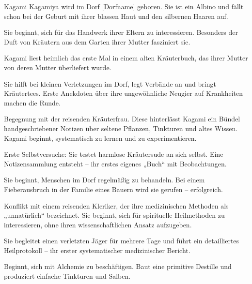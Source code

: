 \documentclass[12pt,a4paper]{article}
\begin{document}
\begin{multicols}{2}
\begin{description}[leftmargin=1.5cm, style=nextline, font=\normalfont\bfseries]

\item[0 Jahre (Geburt)]  
Kagami Kagamiya wird im Dorf [Dorfname] geboren. Sie ist ein Albino und fällt schon bei der Geburt mit ihrer blassen Haut und den silbernen Haaren auf.

\item[5 Jahre]  
Sie beginnt, sich für das Handwerk ihrer Eltern zu interessieren. Besonders der Duft von Kräutern aus dem Garten ihrer Mutter fasziniert sie.

\item[7 Jahre]  
Kagami liest heimlich das erste Mal in einem alten Kräuterbuch, das ihrer Mutter von deren Mutter überliefert wurde.

\item[10 Jahre]  
Sie hilft bei kleinen Verletzungen im Dorf, legt Verbände an und bringt Kräutertees. Erste Anekdoten über ihre ungewöhnliche Neugier auf Krankheiten machen die Runde.

\item[12 Jahre]  
Begegnung mit der reisenden Kräuterfrau. Diese hinterlässt Kagami ein Bündel handgeschriebener Notizen über seltene Pflanzen, Tinkturen und altes Wissen. Kagami beginnt, systematisch zu lernen und zu experimentieren.

\item[13 Jahre]  
Erste Selbstversuche: Sie testet harmlose Kräutersude an sich selbst. Eine Notizensammlung entsteht – ihr erstes eigenes „Buch“ mit Beobachtungen.

\item[14 Jahre]  
Sie beginnt, Menschen im Dorf regelmäßig zu behandeln. Bei einem Fieberausbruch in der Familie eines Bauern wird sie gerufen – erfolgreich.

\item[15 Jahre]  
Konflikt mit einem reisenden Kleriker, der ihre medizinischen Methoden als „unnatürlich“ bezeichnet. Sie beginnt, sich für spirituelle Heilmethoden zu interessieren, ohne ihren wissenschaftlichen Ansatz aufzugeben.

\item[16 Jahre]  
Sie begleitet einen verletzten Jäger für mehrere Tage und führt ein detailliertes Heilprotokoll – ihr erster systematischer medizinischer Bericht.

\item[17 Jahre]  
Beginnt, sich mit Alchemie zu beschäftigen. Baut eine primitive Destille und produziert einfache Tinkturen und Salben.


\end{description}
\end{multicols}
\end{document}
